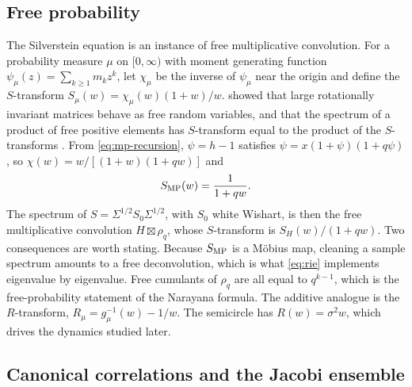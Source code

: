 \subsection*{Free probability}

The Silverstein equation is an instance of free multiplicative convolution. For a probability measure $\mu$ on $[0,\infty)$ with moment generating function $\psi_\mu(z)=\sum_{k\geq1}m_kz^k$, let $\chi_\mu$ be the inverse of $\psi_\mu$ near the origin and define the $S$-transform $S_\mu(w)=\chi_\mu(w)(1+w)/w$. \citet{voiculescu1991limit} showed that large rotationally invariant matrices behave as free random variables, and that the spectrum of a product of free positive elements has $S$-transform equal to the product of the $S$-transforms \citep{voiculescu1992free,mingo2017free}. From \eqref{eq:mp-recursion}, $\psi=h-1$ satisfies $\psi=x(1+\psi)(1+q\psi)$, so $\chi(w)=w/[(1+w)(1+qw)]$ and
\[
 S_{\rm MP}(w)=\frac1{1+qw}.
\]
The spectrum of $S=\Sigma^{1/2}S_0\Sigma^{1/2}$, with $S_0$ white Wishart, is then the free multiplicative convolution $H\boxtimes\rho_q$, whose $S$-transform is $S_H(w)/(1+qw)$. Two consequences are worth stating. Because $S_{\rm MP}$ is a M\"obius map, cleaning a sample spectrum amounts to a free deconvolution, which is what \eqref{eq:rie} implements eigenvalue by eigenvalue. Free cumulants of $\rho_q$ are all equal to $q^{k-1}$, which is the free-probability statement of the Narayana formula. The additive analogue is the $R$-transform, $R_\mu=g_\mu^{-1}(w)-1/w$. The semicircle has $R(w)=\sigma^2w$, which drives the dynamics studied later.

\subsection*{Canonical correlations and the Jacobi ensemble}

